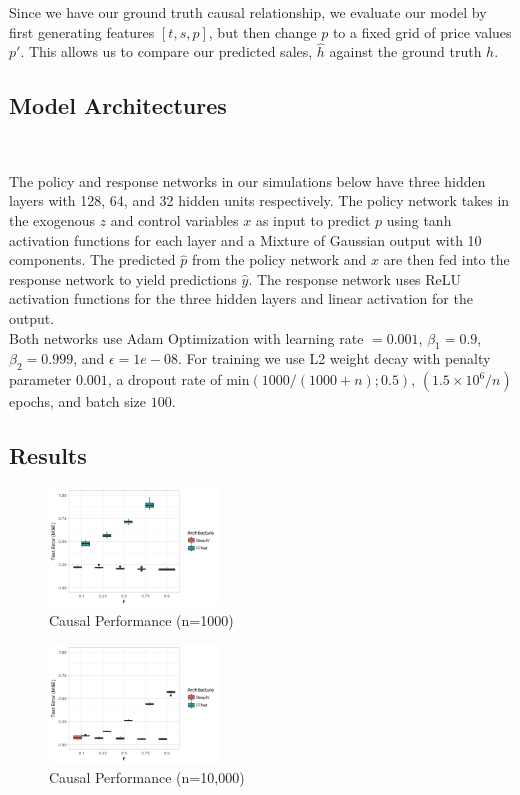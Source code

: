 \documentclass[10.5pt, oneside, twocolumn]{article}   	%
\begin{document}
Since we have our ground truth causal relationship, we evaluate our model by first generating features $[t, s, p]$, but then change $p$ to a fixed grid of price values $p'$. This allows us to compare our predicted sales, $\hat{h}$ against the ground truth $h$. 

\subsection{Model Architectures}\

The policy and response networks in our simulations below have three hidden layers with 128, 64, and 32 hidden units respectively. The policy network takes in the exogenous $z$ and control variables $x$ as input to predict $p$ using tanh activation functions for each layer and a Mixture of Gaussian output with 10 components. The predicted $\hat{p}$ from the policy network and $x$ are then fed into the response network to yield predictions $\hat{y}$. The response network uses ReLU activation functions for the three hidden layers and linear activation for the output. \\

Both networks use Adam Optimization with learning rate $=0.001$, $\beta_1 = 0.9$, $\beta_2 = 0.999$, and $\epsilon = 1e-08$. For training we use L2 weight decay with penalty parameter $0.001$, a dropout rate of $\textrm{min}(1000/(1000+n); 0.5)$, $(1.5 \times 10^6/n)$ epochs, and batch size $100$. 

\subsection{Results} 
\begin{figure}[h]
	\caption{Causal Performance (n=1000)}
	\centering
	\includegraphics[width=0.4\textwidth]{perf_small.png}
\end{figure}

\begin{figure}[h]
	\caption{Causal Performance (n=10,000)}
	\centering
	\includegraphics[width=0.4\textwidth]{perf_big.png}
\end{figure}
\end{document}
